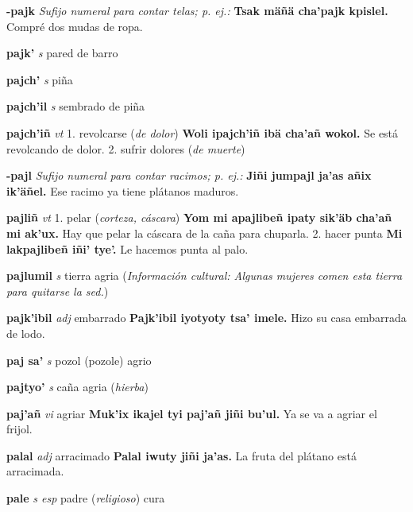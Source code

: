 \documentclass[10pt]{scrbook}
\newcommand{\entry}[1]{\textbf{#1}}
\newcommand{\onedefinition}[1]{#1.}
\newcommand{\nontranslationdef}[1]{\textit{#1}}
\newcommand{\partofspeech}[1]{\textit{#1}}
\newcommand{\spanishtranslation}[1]{#1}
\newcommand{\clarification}[1]{(\textit{#1})}
\newcommand{\cholexample}[1]{\textbf{#1}}
\newcommand{\exampletranslation}[1]{#1}
\newcommand{\culturalinformation}[1]{(\textit{#1})}
\begin{document}
\begin{multicols}{2}
\entry{-pajk}
\nontranslationdef{Sufijo numeral para contar telas; p. ej.:}
\cholexample{Tsak mäñä cha'pajk kpislel.}
\exampletranslation{Compré dos mudas de ropa.}

\entry{pajk'}
\partofspeech{s}
\spanishtranslation{pared de barro}

\entry{pajch'}
\partofspeech{s}
\spanishtranslation{piña}

\entry{pajch'il}
\partofspeech{s}
\spanishtranslation{sembrado de piña}

\entry{pajch'iñ}
\partofspeech{vt}
\onedefinition{1}
\spanishtranslation{revolcarse}
\clarification{de dolor}
\cholexample{Woli ipajch'iñ ibä cha'añ wokol.}
\exampletranslation{Se está revolcando de dolor.}
\onedefinition{2}
\spanishtranslation{sufrir dolores}
\clarification{de muerte}

\entry{-pajl}
\nontranslationdef{Sufijo numeral para contar racimos; p. ej.:}
\cholexample{Jiñi jumpajl ja'as añix ik'äñel.}
\exampletranslation{Ese racimo ya tiene plátanos maduros.}

\entry{pajliñ}
\partofspeech{vt}
\onedefinition{1}
\spanishtranslation{pelar}
\clarification{corteza, cáscara}
\cholexample{Yom mi apajlibeñ ipaty sik'äb cha'añ mi ak'ux.}
\exampletranslation{Hay que pelar la cáscara de la caña para chuparla.}
\onedefinition{2}
\spanishtranslation{hacer punta}
\cholexample{Mi lakpajlibeñ iñi' tye'.}
\exampletranslation{Le hacemos punta al palo.}

\entry{pajlumil}
\partofspeech{s}
\spanishtranslation{tierra agria}
\culturalinformation{Información cultural: Algunas mujeres comen esta tierra para quitarse la sed.}

\entry{pajk'ibil}
\partofspeech{adj}
\spanishtranslation{embarrado}
\cholexample{Pajk'ibil iyotyoty tsa' imele.}
\exampletranslation{Hizo su casa embarrada de lodo.}

\entry{paj sa'}
\partofspeech{s}
\spanishtranslation{pozol (pozole) agrio}

\entry{pajtyo'}
\partofspeech{s}
\spanishtranslation{caña agria}
\clarification{hierba}

\entry{paj'añ}
\partofspeech{vi}
\spanishtranslation{agriar}
\cholexample{Muk'ix ikajel tyi paj'añ jiñi bu'ul.}
\exampletranslation{Ya se va a agriar el frijol.}

\entry{palal}
\partofspeech{adj}
\spanishtranslation{arracimado}
\cholexample{Palal iwuty jiñi ja'as.}
\exampletranslation{La fruta del plátano está arracimada.}

\entry{pale}
\partofspeech{s esp}
\spanishtranslation{padre}
\clarification{religioso}
\spanishtranslation{cura}


\end{multicols}
\end{document}
